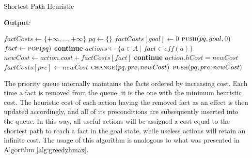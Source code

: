 \begin{algorithm}
	\caption{Shortest Path Heuristic}
	\label{alg:sp}
	\hspace*{0.5em} \textbf{Output}:
	\begin{algorithmic}[1]
		\State $factCosts \gets \{+\infty, \dots, +\infty\}$ 
		\State $pq\gets \{\}$ 
		\State $factCosts[goal] \gets 0$
		\State $\Call{push}{pq, goal, 0}$
		\EndFor
		\State $fact \gets \Call{pop}{pq}$ 
		\State \textbf{continue} 
		\EndIf
		\State $actions \gets \{a \in A \mid fact \in \textit{eff}\left(a\right)\}$
		\State $newCost \gets action.cost + factCosts[fact]$
		\State \textbf{continue}
		\EndIf
		\State $action.hCost = newCost$
		\State $factCosts[pre] \gets newCost$
		\State $\Call{change}{pq, pre, newCost}$
		\Else
		\State $\Call{push}{pq, pre, newCost}$
		\EndIf
		\EndIf
		\EndFor
		\EndFor
		\EndWhile
		\EndProcedure
	\end{algorithmic}
\end{algorithm}

The priority queue internally maintains the facts ordered by increasing cost.
Each time a fact is removed from the queue, it is the one with the minimum heuristic cost.
The heuristic cost of each action having the removed fact as an effect is then updated accordingly,
and all of its preconditions are subsequently inserted into the queue.
In this way, all useful actions will be assigned a cost equal to the shortest path to reach a fact in
the goal state, while useless actions will retain an infinite cost.
The usage of this algorithm is analogous to what was presented in Algorithm \ref{alg:greedyhmax}.
